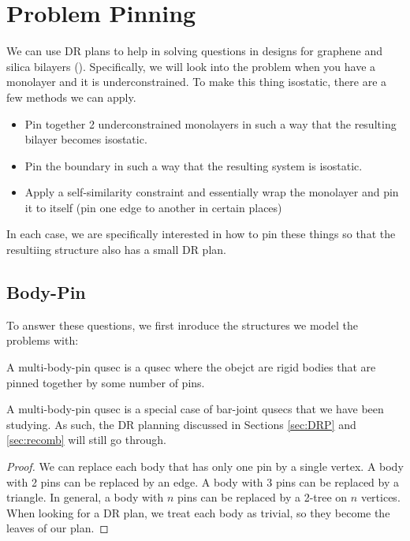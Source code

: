 \section{Problem Pinning}
\label{sec:bodypin}

We can use DR plans to help in solving questions in designs for graphene and silica bilayers (). Specifically, we will look into the problem when you have a monolayer and it is underconstrained. To make this thing isostatic, there are a few methods we can apply.

\begin{itemize}
    \item Pin together 2 underconstrained monolayers in such a way that the resulting bilayer becomes isostatic.
    \item Pin the boundary in such a way that the resulting system is isostatic.
    \item Apply a self-similarity constraint and essentially wrap the monolayer and pin it to itself (pin one edge to another in certain places)
\end{itemize}

In each case, we are specifically interested in how to pin these things so that the resultiing structure also has a small DR plan.

\subsection{Body-Pin}

To answer these questions, we first inroduce the structures we model the problems with:

\begin{definition}
    A multi-body-pin qusec is a qusec where the obejct are rigid bodies that are pinned together by some number of pins.
\end{definition}

\begin{remark}
    A multi-body-pin qusec is a special case of bar-joint qusecs that we have been studying. As such, the DR planning discussed in Sections \ref{sec:DRP} and \ref{sec:recomb} will still go through.
\end{remark}

\begin{proof}
    We can replace each body that has only one pin by a single vertex. A body with 2 pins can be replaced by an edge. A body with 3 pins can be replaced by a triangle. In general, a body with $n$ pins can be replaced by a 2-tree on $n$ vertices. When looking for a DR plan, we treat each body as trivial, so they become the leaves of our plan.
\end{proof}

